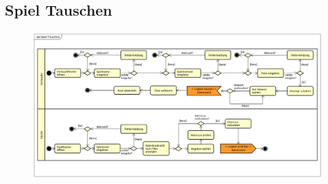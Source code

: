 \vfill

\subsection*{Spiel Tauschen}
\begin{figure}[h]
	\centering
	\includegraphics[width=\linewidth]{docs/3_Aktivitaetsdiagramme/Patrick/Spiel_Tauschen.png}
	\label{fig:ActDia_Spiel_Tauschen}
\end{figure}

\vfill
\pagebreak
